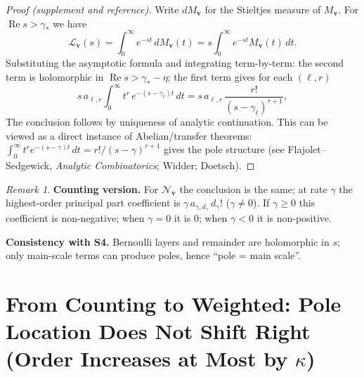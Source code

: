 \documentclass[11pt,a4paper]{article}
\theoremstyle{remark}
\newtheorem{remark}[theorem]{Remark}
\DeclareMathOperator{\Re}{Re}
\begin{document}
\begin{proof}[Proof (supplement and reference)]
Write $dM_{\mathbf{v}}$ for the Stieltjes measure of $M_{\mathbf{v}}$. For $\Re s>\gamma_\ast$ we have
\begin{equation}
\mathcal{L}_{\mathbf{v}}(s)=\int_0^\infty e^{-s t}\,dM_{\mathbf{v}}(t)
=s\int_0^\infty e^{-s t}M_{\mathbf{v}}(t)\,dt .
\end{equation}
Substituting the asymptotic formula and integrating term-by-term: the second term is holomorphic in $\Re s>\gamma_\ast-\eta$; the first term gives for each $(\ell,r)$
\begin{equation}
s\,a_{\ell,r}\int_0^\infty t^r\,e^{-(s-\gamma_\ell)t}\,dt
=s\,a_{\ell,r}\,\frac{r!}{(s-\gamma_\ell)^{r+1}},
\end{equation}
The conclusion follows by uniqueness of analytic continuation. This can be viewed as a direct instance of Abelian/transfer theorems: $\int_0^\infty t^re^{-(s-\gamma)t}\,dt=r!/(s-\gamma)^{r+1}$ gives the pole structure (see Flajolet--Sedgewick, \textit{Analytic Combinatorics}; Widder; Doetsch).
\end{proof}

\begin{remark}
\textbf{Counting version.} For $\mathscr{N}_{\mathbf{v}}$ the conclusion is the same; at rate $\gamma$ the highest-order principal part coefficient is $\gamma\,a_{\gamma,d_\gamma}\,d_\gamma!$ ($\gamma\ne0$). If $\gamma\ge 0$ this coefficient is non-negative; when $\gamma=0$ it is $0$; when $\gamma<0$ it is non-positive.

\textbf{Consistency with S4.} Bernoulli layers and remainder are holomorphic in $s$; only main-scale terms can produce poles, hence ``pole = main scale''.
\end{remark}

\section{From Counting to Weighted: Pole Location Does Not Shift Right (Order Increases at Most by $\kappa$)}
\end{document}
